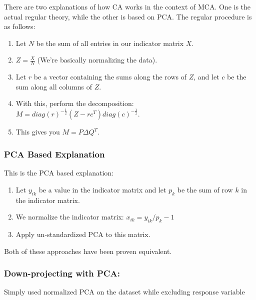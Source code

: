 \documentclass[
]{article}
\providecommand{\tightlist}{%
  \setlength{\itemsep}{0pt}\setlength{\parskip}{0pt}}
\begin{document}
There are two explanations of how CA works in the context of MCA. One is
the actual regular theory, while the other is based on PCA. The regular
procedure is as follows:

\begin{enumerate}
\def\labelenumi{\arabic{enumi}.}
\tightlist
\item
  Let \(N\) be the sum of all entries in our indicator matrix \(X\).
\item
  \(Z=\frac{X}{N}\) (We're basically normalizing the data).
\item
  Let \(r\) be a vector containing the sums along the rows of \(Z\), and
  let \(c\) be the sum along all columns of \(Z\).
\item
  With this, perform the decomposition:
  \(M=diag(r)^{-\frac{1}{2}}(Z-rc^{T})diag(c)^{-\frac{1}{2}}\).
\item
  This gives you \(M=P\Delta Q^{T}\).
\end{enumerate}

\subsubsection{PCA Based Explanation}\label{pca-based-explanation}

This is the PCA based explanation:

\begin{enumerate}
\def\labelenumi{\arabic{enumi}.}
\tightlist
\item
  Let \(y_{ik}\) be a value in the indicator matrix and let \(p_{k}\) be
  the sum of row \(k\) in the indicator matrix.
\item
  We normalize the indicator matrix: \(x_{ik}=y_{ik}/p_{k} - 1\)
\item
  Apply un-standardized PCA to this matrix.
\end{enumerate}

Both of these approaches have been proven equivalent.

\subsubsection{Down-projecting with
PCA:}\label{down-projecting-with-pca}

Simply used normalized PCA on the dataset while excluding response
variable
\end{document}
